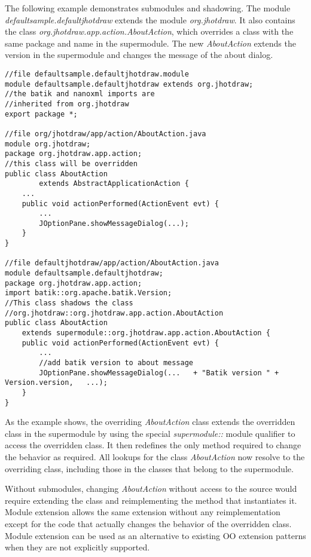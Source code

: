 The following example demonstrates submodules and shadowing. The module
\textit{defaultsample.defaultjhotdraw} extends the module \textit{org.jhotdraw}. 
It also contains the class \textit{org.jhotdraw.app.action.AboutAction},
which overrides a class with the same package and name in the supermodule.
The new \textit{AboutAction} extends the version in the supermodule and
changes the message of the about dialog.

\begin{lstlisting}[caption=Module Subtyping]
//file defaultsample.defaultjhotdraw.module 
module defaultsample.defaultjhotdraw extends org.jhotdraw;
//the batik and nanoxml imports are 
//inherited from org.jhotdraw
export package *;

//file org/jhotdraw/app/action/AboutAction.java
module org.jhotdraw;
package org.jhotdraw.app.action;
//this class will be overridden
public class AboutAction 
		extends AbstractApplicationAction {
	...
	public void actionPerformed(ActionEvent evt) {
		...
		JOptionPane.showMessageDialog(...);
	}
}

//file defaultjhotdraw/app/action/AboutAction.java
module defaultsample.defaultjhotdraw;
package org.jhotdraw.app.action;
import batik::org.apache.batik.Version;
//This class shadows the class
//org.jhotdraw::org.jhotdraw.app.action.AboutAction
public class AboutAction 
	extends supermodule::org.jhotdraw.app.action.AboutAction {
	public void actionPerformed(ActionEvent evt) {
		...
		//add batik version to about message
		JOptionPane.showMessageDialog(...	+ "Batik version " + Version.version,	...);
	}
}

\end{lstlisting}

As the example shows, the overriding \textit{AboutAction} class extends the
overridden class in the supermodule by using the special 
\textit{supermodule::} module qualifier to access the overridden class. It
then redefines the only method required to change the behavior as required.
All lookups for the class \textit{AboutAction} now resolve to the overriding
class, including those in the classes that belong to the supermodule.

Without submodules, changing \textit{AboutAction} without access to the source
would require extending the class and reimplementing the method 
that instantiates it. Module extension allows the same extension without
any reimplementation except for the code that actually changes the behavior of the overridden class.
Module extension can be used as an alternative to existing OO extension patterns when they
are not explicitly supported. 

